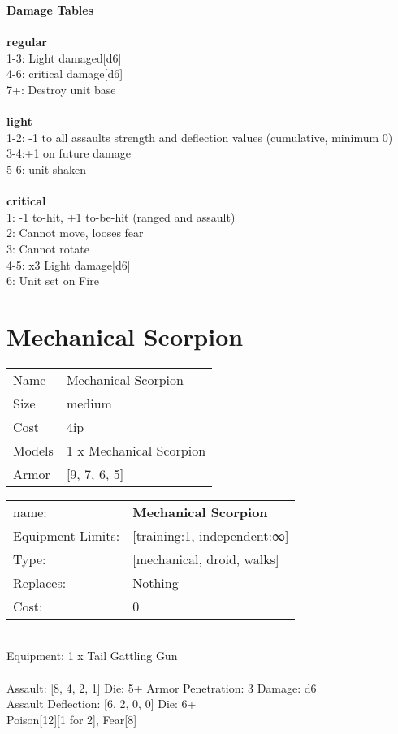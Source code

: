 {\bf Damage Tables} \\
\ \\ {\bf regular } \\
1-3: Light damaged[d6] \\
4-6: critical damage[d6] \\
7+: Destroy unit base \\
\ \\ {\bf light } \\
1-2: -1 to all assaults strength and deflection values (cumulative, minimum 0) \\
3-4:+1 on future damage \\
5-6: unit shaken \\
\ \\ {\bf critical } \\
1: -1 to-hit, +1 to-be-hit (ranged and assault) \\
2: Cannot move, looses fear \\
3: Cannot rotate \\
4-5: x3 Light damage[d6] \\
6: Unit set on Fire \\










\pagebreak\pagebreak

\section{ Mechanical Scorpion }

\begin{tabular}{ll}
  Name & Mechanical Scorpion \\
  Size & medium\\
  Cost & 4ip\\
  Models & 1 x Mechanical Scorpion\\
  Armor & [9, 7, 6, 5]\\
\end{tabular}

\noindent 

\noindent
\begin{tabular}{ll}
name: &{\bf Mechanical Scorpion } \\
Equipment Limits: &[training:1, independent:∞] \\
Type: &[mechanical, droid, walks] \\
Replaces: &Nothing \\
Cost: & 0\\
\end{tabular}
\ \\
Equipment: 1 x Tail Gattling Gun \\
\ \\
Assault: [8, 4, 2, 1] Die: 5+ Armor Penetration: 3 Damage: d6 \\
Assault Deflection: [6, 2, 0, 0] Die: 6+\\
\indent Poison[12][1 for 2], Fear[8]\\ 
 
